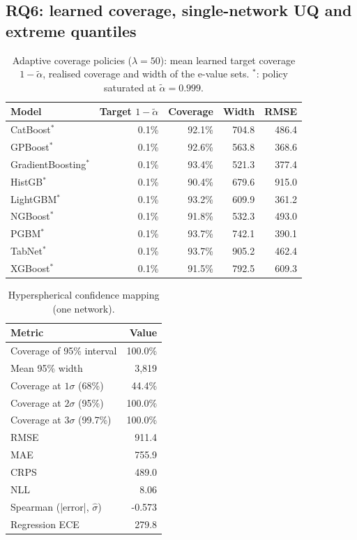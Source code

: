 \documentclass[11pt]{article}
\begin{document}
\subsection{RQ6: learned coverage, single-network UQ and extreme quantiles}
\begin{table}[t]\centering\small
\caption{Adaptive coverage policies ($\lambda=50$): mean learned target coverage $1-\tilde\alpha$, realised coverage and width of the e-value sets. $^\ast$: policy saturated at $\tilde\alpha=0.999$.}\label{tab:acp}
\begin{tabular}{lrrrr}\toprule Model & Target $1-\tilde\alpha$ & Coverage & Width & RMSE\\\midrule
CatBoost$^\ast$ & 0.1\% & 92.1\% & 704.8 & 486.4\\
GPBoost$^\ast$ & 0.1\% & 92.6\% & 563.8 & 368.6\\
GradientBoosting$^\ast$ & 0.1\% & 93.4\% & 521.3 & 377.4\\
HistGB$^\ast$ & 0.1\% & 90.4\% & 679.6 & 915.0\\
LightGBM$^\ast$ & 0.1\% & 93.2\% & 609.9 & 361.2\\
NGBoost$^\ast$ & 0.1\% & 91.8\% & 532.3 & 493.0\\
PGBM$^\ast$ & 0.1\% & 93.7\% & 742.1 & 390.1\\
TabNet$^\ast$ & 0.1\% & 93.7\% & 905.2 & 462.4\\
XGBoost$^\ast$ & 0.1\% & 91.5\% & 792.5 & 609.3\\
\bottomrule\end{tabular}\end{table}
\begin{table}[t]\centering\small
\caption{Hyperspherical confidence mapping (one network).}\label{tab:hcm}
\begin{tabular}{lr}\toprule Metric & Value\\\midrule
Coverage of 95\% interval & 100.0\%\\
Mean 95\% width & 3,819\\
Coverage at $1\sigma$ (68\%) & 44.4\%\\
Coverage at $2\sigma$ (95\%) & 100.0\%\\
Coverage at $3\sigma$ (99.7\%) & 100.0\%\\
RMSE & 911.4\\
MAE & 755.9\\
CRPS & 489.0\\
NLL & 8.06\\
Spearman (|error|, $\hat\sigma$) & -0.573\\
Regression ECE & 279.8\\
\bottomrule\end{tabular}\end{table}
\end{document}
